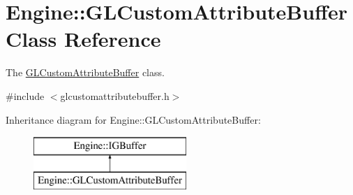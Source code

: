 \hypertarget{classEngine_1_1GLCustomAttributeBuffer}{}\section{Engine\+:\+:G\+L\+Custom\+Attribute\+Buffer Class Reference}
\label{classEngine_1_1GLCustomAttributeBuffer}


The \hyperlink{classEngine_1_1GLCustomAttributeBuffer}{G\+L\+Custom\+Attribute\+Buffer} class.  




{\ttfamily \#include $<$glcustomattributebuffer.\+h$>$}

Inheritance diagram for Engine\+:\+:G\+L\+Custom\+Attribute\+Buffer\+:\begin{figure}[H]
\begin{center}
\leavevmode
\includegraphics[height=2.000000cm]{classEngine_1_1GLCustomAttributeBuffer}
\end{center}
\end{figure}
